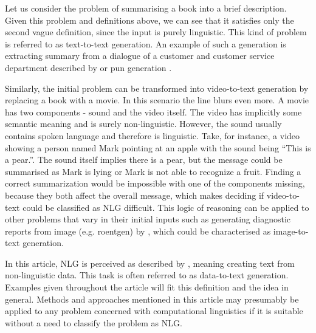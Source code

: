 Let us consider the problem of summarising a book into a brief description. Given this problem and definitions above, we can see that it satisfies only the second vague definition, since the input is purely linguistic. This kind of problem is referred to as text-to-text generation. An example of such a generation is extracting summary from a dialogue of a customer and customer service department described by \cite{liu2019automatic} or pun generation \cite{ritchie2005computational}.
 
Similarly, the initial problem can be transformed into video-to-text generation by replacing a book with a movie. In this scenario the line blurs even more. A movie has two components - sound and the video itself. The video has implicitly some semantic meaning and is surely non-linguistic. However, the sound usually contains spoken language and therefore is linguistic. Take, for instance, a video showing a person named Mark pointing at an apple with the sound being “This is a pear.”. The sound itself implies there is a pear, but the message could be summarised as Mark is lying or Mark is not able to recognize a fruit. Finding a correct summarization would be impossible with one of the components missing, because they both affect the overall message, which makes deciding if video-to-text could be classified as NLG difficult. This logic of reasoning can be applied to other problems that vary in their initial inputs such as generating diagnostic reports from image (e.g. roentgen) by \cite{zeng2020generating}, which could be characterised as image-to-text generation.

In this article, NLG is perceived as described by \cite{reiter1997building}, meaning creating text from non-linguistic data. This task is often referred to as data-to-text generation. Examples given throughout the article will fit this definition and the idea in general. Methods and approaches mentioned in this article may presumably be applied to any problem concerned with computational linguistics if it is suitable without a need to classify the problem as NLG.

